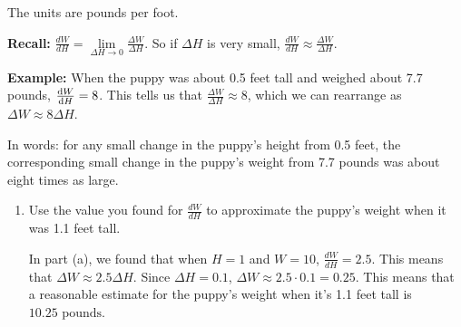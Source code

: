 \documentclass{article}
\begin{document}
\begin{enumerate}
\begin{enumerate}
    \begin{solution} %
      The units are pounds per foot.
    \end{solution}

    \end{enumerate}


    \begin{framed}
    \textbf{Recall:}
    $\frac{dW}{dH}=\lim\limits_{\Delta H\to 0}\frac{\Delta W}{\Delta H}$.
    So if $\Delta H$ is very small, $\frac{dW}{dH} \approx \frac{\Delta W}{\Delta H}$.
    
    \textbf{Example:} When the puppy was about 0.5 feet tall and weighed about 7.7 pounds, $\diff{W}{H}=8$.
    This tells us that $\frac{\Delta W}{\Delta H} \approx 8$, which we can rearrange as $\Delta W \approx 8\Delta H$. 
    
    In words: for any small change in the puppy's height from 0.5 feet, the corresponding small change in the puppy's weight from 7.7 pounds was about eight times as large.
    \end{framed}


    \begin{enumerate}[resume]

  \item
    \begin{problem}[\stretch{0.5}]
      Use the value you found for $\frac{dW}{dH}$ to approximate the puppy's weight when it was 1.1 feet tall.
    \end{problem}

    \begin{solution}
      In part (a), we found that when $H=1$ and $W=10$, $\frac{dW}{dH}=2.5$.
      This means that $\Delta W \approx 2.5 \Delta H$. Since $\Delta H = 0.1$,
      $\Delta W \approx 2.5 \cdot 0.1 = 0.25$. This means that a reasonable
      estimate for the puppy's weight when it's 1.1 feet tall is $\boxed{10.25 \text{ pounds}}$.
    \end{solution}

    



\end{enumerate}
\end{enumerate}
\end{document}
